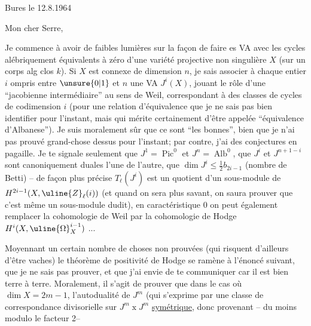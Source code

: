 

Bures le 12.8.1964

Mon cher Serre,

Je commence à avoir de faibles lumières sur la façon de faire es VA avec les cycles alébriquement équivalents à zéro d'une variété projective non singulière $X$ (sur un corps alg clos $k$). Si $X$ est connexe de dimension $n$, je sais associer à chaque entier $i$ ompris entre $\unsure{0|1}$ et $n$ une VA $J^i(X)$, jouant le rôle d'une ``jacobienne intermédiaire'' au sens de Weil, correspondant à des classes de cycles de codimension $i$ (pour une relation d'équivalence que je ne sais pas bien identifier pour l'instant, mais qui mérite certainement d'être appelée ``équivalence d'Albanese''). Je suis moralement sûr que ce sont ``les bonnes'', bien que je n'ai pas prouvé grand-chose dessus pour l'instant; par contre, j'ai des conjectures en pagaille. Je te signale seulement que $J^1=\operatorname{Pic}^{0}$ et $J^n=\operatorname{Alb}^{0}$, que $J^i$ et $J^{n+1-i}$ sont canoniquement duales l'une de l'autre, que $\dim J^i\leq\frac12 b_{2i-1}$ (nombre de Betti) -- de façon plus précise $T_{\ell}(J^i)$ est un quotient d'un sous-module de $H^{2i-1}(X,\uline{Z}_{\ell}(i))$ (et quand on sera plus savant, on saura prouver que c'est même un sous-module dudit), en caractéristique $0$ on peut également remplacer la cohomologie de Weil par la cohomologie de Hodge $H^i(X,\uline{\Omega}^{i-1}_X)$ ...


Moyennant un certain nombre de choses non prouvées (qui risquent d'ailleurs d'être vaches) le théorème de positivité de Hodge se ramène à l'énoncé suivant, que je ne sais pas prouver, et que j'ai envie de te communiquer car il est bien terre à terre. Moralement, il s'agit de prouver que dans le cas où $\dim X=2m-1$, l'autodualité de $J^m$ (qui s'exprime par une classe de correspondance divisorielle sur $J^m\mathbin{x}J^m$  \uline{symétrique}, donc provenant -- du moins modulo le facteur 2--



